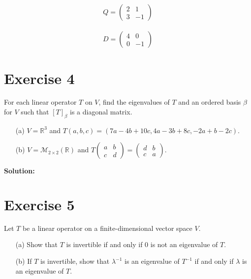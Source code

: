 \documentclass{article}
\begin{document}
\begin{align*}
Q = \begin{pmatrix} 2 & 1 \\ 3 & -1 \end{pmatrix}
\end{align*}

\begin{align*}
D = \begin{pmatrix} 4 & 0 \\ 0 & -1 \end{pmatrix}
\end{align*}

\newpage

\section*{Exercise 4}
For each linear operator $T$ on $V$, find the eigenvalues of $T$ and an ordered basis $\beta$ for $V$ such that $[T]_\beta$ is a diagonal matrix.

\begin{enumerate}
    \item[(a)] $V = \mathbb{R}^3$ and $T(a,b,c) = (7a - 4b + 10c, 4a - 3b + 8c, -2a + b - 2c)$.

    \item[(b)] $V = \mathcal{M}_{2\times 2}(\mathbb{R})$ and $T\begin{pmatrix} a & b \\ c & d \end{pmatrix} = \begin{pmatrix} d & b \\ c & a \end{pmatrix}$.
\end{enumerate}

\textbf{Solution:} \\



\newpage

\section*{Exercise 5}
Let $T$ be a linear operator on a finite-dimensional vector space $V$.

\begin{enumerate}
    \item[(a)] Show that $T$ is invertible if and only if $0$ is not an eigenvalue of $T$.

    \item[(b)] If $T$ is invertible, show that $\lambda^{-1}$ is an eigenvalue of $T^{-1}$ if and only if $\lambda$ is an eigenvalue of $T$.
\end{enumerate}
\end{document}
